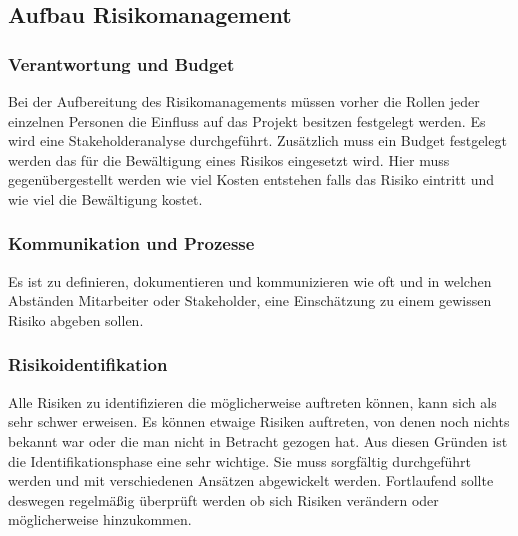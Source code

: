 \subsection{Aufbau Risikomanagement}
\subsubsection{Verantwortung und Budget}
Bei der Aufbereitung des Risikomanagements müssen vorher die Rollen jeder einzelnen Personen die Einfluss auf das Projekt besitzen festgelegt werden. Es wird eine Stakeholderanalyse durchgeführt.
Zusätzlich muss ein Budget festgelegt werden das für die Bewältigung eines Risikos eingesetzt wird. Hier muss gegenübergestellt werden wie viel Kosten entstehen falls das Risiko eintritt und wie viel die Bewältigung kostet.

\subsubsection{Kommunikation und Prozesse}
Es ist zu definieren, dokumentieren und kommunizieren wie oft und in welchen Abständen Mitarbeiter oder Stakeholder, eine Einschätzung zu einem gewissen Risiko abgeben sollen. 

\subsubsection{Risikoidentifikation}
Alle Risiken zu identifizieren die möglicherweise auftreten können, kann sich als sehr schwer erweisen. Es können etwaige Risiken auftreten, von denen noch nichts bekannt war oder die man nicht in Betracht gezogen hat. Aus diesen Gründen ist die Identifikationsphase eine sehr wichtige. Sie muss sorgfältig durchgeführt werden und mit verschiedenen Ansätzen abgewickelt werden. Fortlaufend sollte deswegen regelmäßig überprüft werden ob sich Risiken verändern oder möglicherweise hinzukommen.
\\


